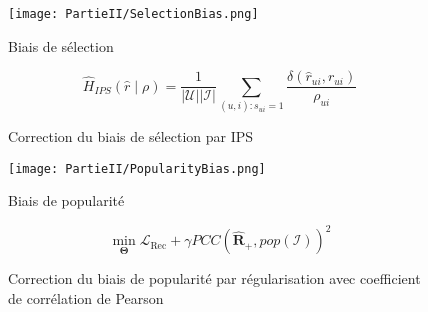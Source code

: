 \begin{frame}{\PartieII}{\Bias}

    \begin{figure}
        \centering
        \texttt{[image: PartieII/SelectionBias.png]}
        \caption{Biais de sélection}
    \end{figure}

\end{frame}

\begin{frame}{\PartieII}{\Bias}

    \begin{figure}
        \begin{equation*}
            \hat{H}_{I P S}(\hat{r} \mid \rho)=\frac{1}{|\mathcal{U}||\mathcal{I}|} \sum_{(u, i): s_{u i}=1} \frac{\delta\left(\hat{r}_{u i}, r_{u i}\right)}{\rho_{u i}}
        \end{equation*}
        \caption{Correction du biais de sélection par IPS}
    \end{figure}

\end{frame}

\begin{frame}{\PartieII}{\Bias}

    \begin{figure}
        \centering
        \texttt{[image: PartieII/PopularityBias.png]}
        \caption{Biais de popularité}
    \end{figure}

\end{frame}

\begin{frame}{\PartieII}{\Bias}

    \begin{figure}
        \begin{equation*}
            \min _{\boldsymbol{\Theta}} \mathcal{L}_{\operatorname{Rec}}+\gamma P C C\left(\widehat{\mathbf{R}}_{+}, p o p(\mathcal{I})\right)^2
        \end{equation*}
        \caption{Correction du biais de popularité par régularisation avec coefficient de corrélation de Pearson}
    \end{figure}

\end{frame}

\begin{frame}{\PartieII}{\Bias}

    \begin{figure}
        \centering
    \end{figure}

\end{frame}

